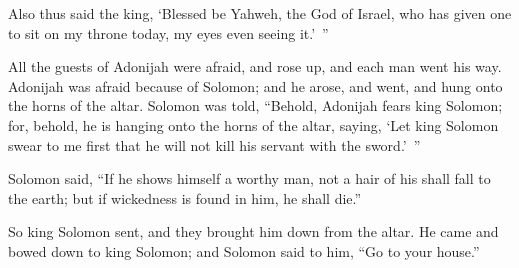 {Also thus said the king, ‘Blessed be Yahweh, the God of Israel, who has given one to sit on my throne today, my eyes even seeing it.’ ”
\par }{\PP {}All the guests of Adonijah were afraid, and rose up, and each man went his way.
Adonijah was afraid because of Solomon; and he arose, and went, and hung onto the horns of the altar.
Solomon was told, “Behold, Adonijah fears king Solomon; for, behold, he is hanging onto the horns of the altar, saying, ‘Let king Solomon swear to me first that he will not kill his servant with the sword.’ ”
\par }{\PP {}Solomon said, “If he shows himself a worthy man, not a hair of his shall fall to the earth; but if wickedness is found in him, he shall die.”
\par }{\PP {}So king Solomon sent, and they brought him down from the altar. He came and bowed down to king Solomon; and Solomon said to him, “Go to your house.”

}
